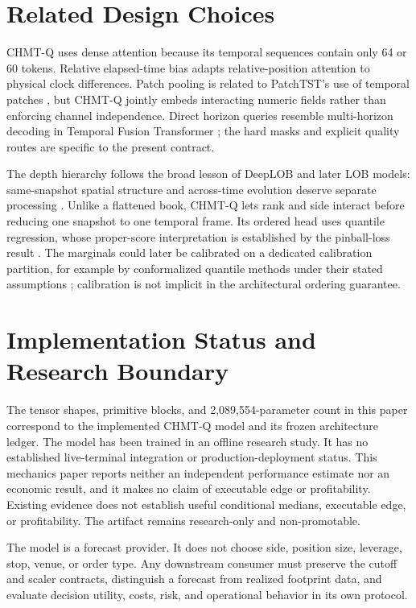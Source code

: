 \documentclass[10pt,letterpaper]{article}
\numberwithin{equation}{section}
\theoremstyle{definition}
\theoremstyle{remark}
\begin{document}
\section{Related Design Choices}

CHMT-Q uses dense attention because its temporal sequences contain only 64 or
60 tokens. Relative elapsed-time bias adapts relative-position attention
\citep{shaw2018} to physical clock differences. Patch pooling is related to
PatchTST's use of temporal patches \citep{nie2023}, but CHMT-Q jointly embeds
interacting numeric fields rather than enforcing channel independence. Direct
horizon queries resemble multi-horizon decoding in Temporal Fusion Transformer
\citep{lim2021}; the hard masks and explicit quality routes are specific to the
present contract.

The depth hierarchy follows the broad lesson of DeepLOB and later LOB models:
same-snapshot spatial structure and across-time evolution deserve separate
processing \citep{deepLOB2019,wallbridge2020,zhang2021lob}. Unlike a flattened
book, CHMT-Q lets rank and side interact before reducing one snapshot to one
temporal frame. Its ordered head uses quantile regression, whose proper-score
interpretation is established by the pinball-loss result
\citep{gneiting2007}. The marginals could later be calibrated on a dedicated
calibration partition, for example by conformalized quantile methods under
their stated assumptions \citep{romano2019}; calibration is not implicit in
the architectural ordering guarantee.

\section{Implementation Status and Research Boundary}

The tensor shapes, primitive blocks, and 2,089,554-parameter count in this
paper correspond to the implemented CHMT-Q model and its frozen architecture
ledger. The model has been trained in an offline research study. It has no
established live-terminal integration or production-deployment status. This
mechanics paper reports neither an independent performance estimate nor an
economic result, and it makes no claim of executable edge or profitability.
Existing evidence does not establish useful conditional medians, executable
edge, or profitability. The artifact remains research-only and non-promotable.

The model is a forecast provider. It does not choose side, position size,
leverage, stop, venue, or order type. Any downstream consumer must preserve the
cutoff and scaler contracts, distinguish a forecast from realized footprint
data, and evaluate decision utility, costs, risk, and operational behavior in
its own protocol.
\end{document}
